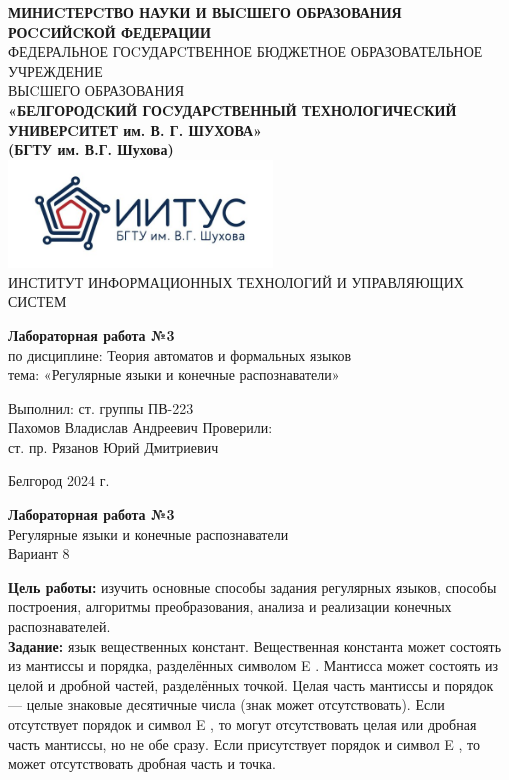 \documentclass[a4paper,14pt]{extarticle}
\newcommand\textbox[1]{
	\parbox{.45\textwidth}{#1}
}
\begin{document}
\begin{center}
    \small{
        \textbf{МИНИCТЕРCТВО НАУКИ И ВЫCШЕГО ОБРАЗОВАНИЯ РОCCИЙCКОЙ ФЕДЕРАЦИИ}\\
        ФЕДЕРАЛЬНОЕ ГОCУДАРCТВЕННОЕ БЮДЖЕТНОЕ ОБРАЗОВАТЕЛЬНОЕ УЧРЕЖДЕНИЕ\\ВЫCШЕГО ОБРАЗОВАНИЯ \\
        \textbf{«БЕЛГОРОДCКИЙ ГОCУДАРCТВЕННЫЙ ТЕХНОЛОГИЧЕCКИЙ\\УНИВЕРCИТЕТ им. В. Г. ШУХОВА»\\ (БГТУ им. В.Г. Шухова)} \\
        \bigbreak
        \includegraphics[width=70mm]{log}\\
        ИНСТИТУТ ИНФОРМАЦИОННЫХ ТЕХНОЛОГИЙ И УПРАВЛЯЮЩИХ СИСТЕМ\\}
\end{center}

\vfill
\begin{center}
    \large{
        \textbf{
            Лабораторная работа №3}}\\
    \normalsize{
        по дисциплине: Теория автоматов и формальных языков \\
        тема: «Регулярные языки и конечные распознаватели»}
\end{center}
\vfill
\hfill\textbox{
    Выполнил: ст. группы ПВ-223\\Пахомов Владислав Андреевич
    \bigbreak
    Проверили: \\ст. пр. Рязанов Юрий Дмитриевич
}
\vfill\begin{center}
    Белгород 2024 г.
\end{center}
\newpage
\begin{center}
    \textbf{Лабораторная работа №3}\\
    Регулярные языки и конечные распознаватели\\
    Вариант 8
\end{center}
\textbf{Цель работы: }изучить основные способы задания регулярных языков, 
способы построения, алгоритмы преобразования, анализа и реализации конечных 
распознавателей.\\
\textbf{Задание: }язык вещественных констант.
Вещественная константа может состоять из мантиссы и порядка,
разделённых символом E . Мантисса может состоять из целой и дробной 
частей, разделённых точкой. Целая часть мантиссы и порядок —
целые знаковые десятичные числа (знак может отсутствовать). Если
отсутствует порядок и символ E , то могут отсутствовать целая или
дробная часть мантиссы, но не обе сразу. Если присутствует порядок и
символ E , то может отсутствовать дробная часть и точка.
\end{document}
